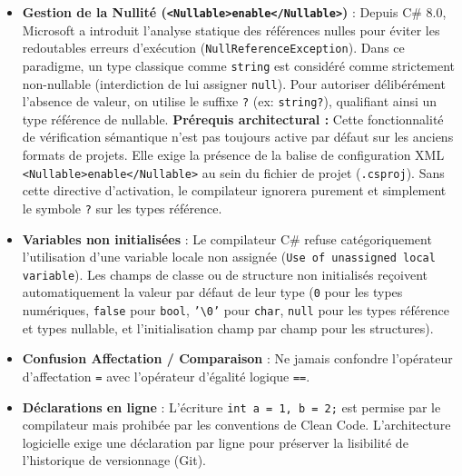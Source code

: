 \begin{tcolorbox}[colback=white,colframe=stringcolor,title=\textbf{Règles strictes de développement C\#}]
    \begin{itemize}
        \item \textbf{Gestion de la Nullité (\texttt{<Nullable>enable</Nullable>})} : Depuis C\# 8.0, Microsoft a introduit l'analyse statique des références nulles pour éviter les redoutables erreurs d'exécution (\texttt{NullReferenceException}). Dans ce paradigme, un type classique comme \texttt{string} est considéré comme strictement non-nullable (interdiction de lui assigner \texttt{null}). Pour autoriser délibérément l'absence de valeur, on utilise le suffixe \texttt{?} (ex: \texttt{string?}), qualifiant ainsi un type référence de nullable. \textbf{Prérequis architectural :} Cette fonctionnalité de vérification sémantique n'est pas toujours active par défaut sur les anciens formats de projets. Elle exige la présence de la balise de configuration XML \texttt{<Nullable>enable</Nullable>} au sein du fichier de projet (\texttt{.csproj}). Sans cette directive d'activation, le compilateur ignorera purement et simplement le symbole \texttt{?} sur les types référence.
        \item \textbf{Variables non initialisées} : Le compilateur C\# refuse catégoriquement l'utilisation d'une variable locale non assignée (\texttt{Use of unassigned local variable}). Les champs de classe ou de structure non initialisés reçoivent automatiquement la valeur par défaut de leur type (\texttt{0} pour les types numériques, \texttt{false} pour \texttt{bool}, \texttt{'\textbackslash 0'} pour \texttt{char}, \texttt{null} pour les types référence et types nullable, et l'initialisation champ par champ pour les structures).
        \item \textbf{Confusion Affectation / Comparaison} : Ne jamais confondre l'opérateur d'affectation \texttt{=} avec l'opérateur d'égalité logique \texttt{==}.
        \item \textbf{Déclarations en ligne} : L'écriture \texttt{int a = 1, b = 2;} est permise par le compilateur mais prohibée par les conventions de Clean Code. L'architecture logicielle exige une déclaration par ligne pour préserver la lisibilité de l'historique de versionnage (Git).
    \end{itemize}
\end{tcolorbox}
